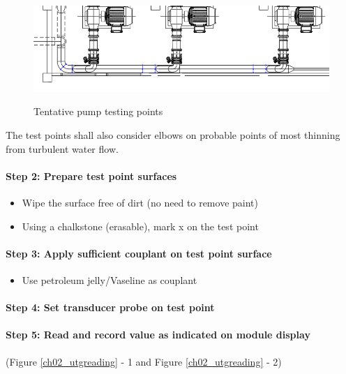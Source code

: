 \begin{figure}[!htb]
	\includegraphics[scale=0.7]{figures/ch02_samplepumptestpoints02} \\
	\caption{Tentative pump testing points}
	\label{ch02_samplepumptestpoints02} 
\end{figure}

The test points shall also consider elbows on probable points of most thinning from turbulent water flow.

\paragraph{Step 2: Prepare test point surfaces}
\begin{itemize}
\item	Wipe the surface free of dirt (no need to remove paint)
\item	Using a chalkstone (erasable), mark x on the test point
\end{itemize}

\paragraph{Step 3: Apply sufficient couplant on test point surface}
\begin{itemize}
\item	Use petroleum jelly/Vaseline as couplant
\end{itemize}

\paragraph{Step 4: Set transducer probe on test point}

\paragraph{Step 5: Read and record value as indicated on module display} (Figure \ref{ch02_utgreading} - 1 and Figure \ref{ch02_utgreading} - 2) 

